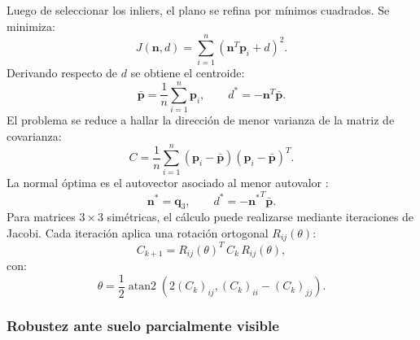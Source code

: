 Luego de seleccionar los inliers, el plano se refina por mínimos cuadrados. Se minimiza:
\begin{equation}
  J(\mathbf{n},d) =
  \sum_{i=1}^{n}\left(\mathbf{n}^T\mathbf{p}_i+d\right)^2.
  \label{eq:ls-objective}
\end{equation}
Derivando respecto de $d$ se obtiene el centroide:
\begin{equation}
  \bar{\mathbf{p}} = \frac{1}{n}\sum_{i=1}^{n}\mathbf{p}_i,
  \qquad
  d^*=-\mathbf{n}^T\bar{\mathbf{p}}.
  \label{eq:centroid}
\end{equation}
El problema se reduce a hallar la dirección de menor varianza de la matriz de covarianza:
\begin{equation}
  C=\frac{1}{n}\sum_{i=1}^{n}
  (\mathbf{p}_i-\bar{\mathbf{p}})
  (\mathbf{p}_i-\bar{\mathbf{p}})^T.
  \label{eq:covariance}
\end{equation}
La normal óptima es el autovector asociado al menor autovalor \cite[App.~A4]{Hartley2004}:
\begin{equation}
  \mathbf{n}^*=\mathbf{q}_3,
  \qquad
  d^*=-{\mathbf{n}^*}^T\bar{\mathbf{p}}.
  \label{eq:plane-d}
\end{equation}
Para matrices $3\times3$ simétricas, el cálculo puede realizarse mediante iteraciones de
Jacobi. Cada iteración aplica una rotación ortogonal $R_{ij}(\theta)$:
\begin{equation}
  C_{k+1}=R_{ij}(\theta)^T\,C_k\,R_{ij}(\theta),
  \label{eq:jacobi-rotation}
\end{equation}
con:
\begin{equation}
  \theta =
  \frac{1}{2}
  \operatorname{atan2}\!\left(2(C_k)_{ij},(C_k)_{ii}-(C_k)_{jj}\right).
  \label{eq:jacobi-angle}
\end{equation}

\subsubsection{Robustez ante suelo parcialmente visible}

